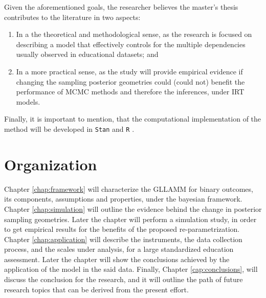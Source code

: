 \noindent Given the aforementioned goals, the researcher believes the master's thesis contributes to the literature in two aspects: 

\begin{enumerate}
	\item In a the theoretical and methodological sense, as the research is focused on describing a model that effectively controls for the multiple dependencies usually observed in educational datasets; and 
	
	\item In a more practical sense, as the study will provide empirical evidence if changing the sampling posterior geometries could (could not) benefit the performance of MCMC methods and therefore the inferences, under IRT models.
\end{enumerate}

\noindent Finally, it is important to mention, that the computational implementation of the method will be developed in \texttt{Stan} \cite{Stan2020} and \texttt{R} \cite{R2015, RStan2020}.



\section{Organization}

Chapter \ref{chap:framework} will characterize the GLLAMM for binary outcomes, its components, assumptions and properties, under the bayesian framework. Chapter \ref{chap:simulation} will outline the evidence behind the change in posterior sampling geometries. Later the chapter will perform a simulation study, in order to get empirical results for the benefits of the proposed re-parametrization. Chapter \ref{chap:application} will describe the instruments, the data collection process, and the scales  under analysis, for a large standardized education assessment. Later the chapter will show the conclusions achieved by the application of the model in the said data. Finally, Chapter \ref{cap:conclusions}, will discuss the conclusion for the research, and it will outline the path of future research topics that can be derived from the present effort.

